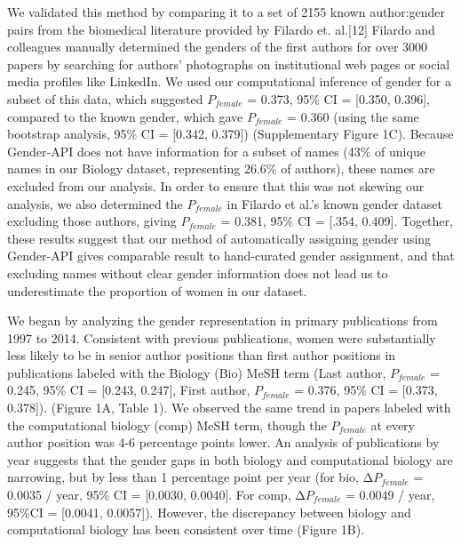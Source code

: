 \documentclass[11pt]{article}
\begin{document}
We validated this method by comparing it to a set of 2155 known author:gender pairs from the biomedical literature provided by Filardo et. al.[12] Filardo and colleagues manually determined the genders of the first authors for over 3000 papers by searching for authors’ photographs on institutional web pages or social media profiles like LinkedIn. We used our computational inference of gender for a subset of this data, which suggested $P_{female}$ = 0.373, 95\% CI = [0.350, 0.396], compared to the known gender, which gave $P_{female}$ = 0.360 (using the same bootstrap analysis, 95\% CI = [0.342, 0.379]) (Supplementary Figure 1C). Because Gender-API does not have information for a subset of names (43\% of unique names in our Biology dataset, representing 26.6\% of authors), these names are excluded from our analysis. In order to ensure that this was not skewing our analysis, we also determined the $P_{female}$ in Filardo et al.'s known gender dataset excluding those authors, giving $P_{female}$ = 0.381, 95\% CI = [.354, 0.409]. Together, these results suggest that our method of automatically assigning gender using Gender-API gives comparable result to hand-curated gender assignment, and that excluding names without clear gender information does not lead us to underestimate the proportion of women in our dataset.

We began by analyzing the gender representation in primary publications from 1997 to 2014. Consistent with previous publications, women were substantially less likely to be in senior author positions than first author positions in publications labeled with the Biology (Bio) MeSH term (Last author, $P_{female}$ = 0.245, 95\% CI = [0.243, 0.247], First author, $P_{female}$ = 0.376, 95\% CI = [0.373, 0.378]). (Figure 1A, Table 1). We observed the same trend in papers labeled with the computational biology (comp) MeSH term, though the $P_{female}$ at every author position was 4-6  percentage points lower. An analysis of publications by year suggests that the gender gaps in both biology and computational biology are narrowing, but by less than 1 percentage point  per year (for bio, Δ$P_{female}$ = 0.0035 / year, 95\% CI = [0.0030, 0.0040]. For comp, Δ$P_{female}$ = 0.0049 / year, 95\%CI = [0.0041, 0.0057]). However, the discrepancy between biology and computational biology has been consistent over time (Figure 1B).
\end{document}
